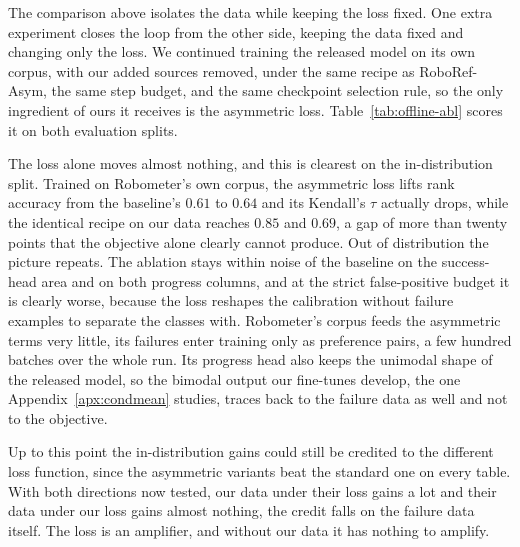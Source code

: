 The comparison above isolates the data while keeping the loss fixed. One extra experiment closes the loop from the other side, keeping the data fixed and changing only the loss. We continued training the released model on its own corpus, with our added sources removed, under the same recipe as RoboRef-Asym, the same step budget, and the same checkpoint selection rule, so the only ingredient of ours it receives is the asymmetric loss. Table~\ref{tab:offline-abl} scores it on both evaluation splits. 

The loss alone moves almost nothing, and this is clearest on the in-distribution split. Trained on Robometer's own corpus, the asymmetric loss lifts rank accuracy from the baseline's $0.61$ to $0.64$ and its Kendall's $\tau$ actually drops, while the identical recipe on our data reaches $0.85$ and $0.69$, a gap of more than twenty points that the objective alone clearly cannot produce. Out of distribution the picture repeats. The ablation stays within noise of the baseline on the success-head area and on both progress columns, and at the strict false-positive budget it is clearly worse, because the loss reshapes the calibration without failure examples to separate the classes with. Robometer's corpus feeds the asymmetric terms very little, its failures enter training only as preference pairs, a few hundred batches over the whole run. Its progress head also keeps the unimodal shape of the released model, so the bimodal output our fine-tunes develop, the one Appendix~\ref{apx:condmean} studies, traces back to the failure data as well and not to the objective.

Up to this point the in-distribution gains could still be credited to the different loss function, since the asymmetric variants beat the standard one on every table. With both directions now tested, our data under their loss gains a lot and their data under our loss gains almost nothing, the credit falls on the failure data itself. The loss is an amplifier, and without our data it has nothing to amplify.

